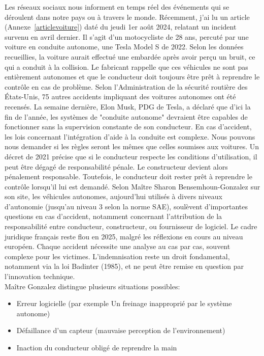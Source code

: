 Les réseaux sociaux nous informent en temps réel des événements qui se déroulent dans notre pays ou à travers le monde. 
Récemment, j'ai lu un article (Annexe~\ref{articlevoiture}) daté du jeudi 1er août 2024, relatant un incident survenu en avril dernier. Il s'agit d'un motocycliste de 28 ans, percuté par une voiture en conduite autonome, une Tesla Model S de 2022. Selon les données recueillies, la voiture aurait effectué une embardée après avoir perçu un bruit, ce qui a conduit à la collision. Le fabricant rappelle que ces véhicules ne sont pas entièrement autonomes et que le conducteur doit toujours être prêt à reprendre le contrôle en cas de problème. Selon l'Administration de la sécurité routière des États-Unis, 75 autres accidents impliquant des voitures autonomes ont été recensés. 
La semaine dernière, Elon Musk, PDG de Tesla, a déclaré que d'ici la fin de l'année, les systèmes de "conduite autonome" devraient être capables de fonctionner sans la supervision constante de son conducteur.
En cas d'accident, les lois concernant l'intégration d'aide à la conduite est complexe. Nous pouvons nous demander si les règles seront les mêmes que celles soumises aux voitures. Un décret de 2021 précise que si le conducteur respecte les conditions d’utilisation, il peut être dégagé de responsabilité pénale. Le constructeur devient alors pénalement responsable. Toutefois, le conducteur doit rester prêt à reprendre le contrôle lorsqu’il lui est demandé. Selon  Maître Sharon Bensemhoun-Gonzalez sur son site\cite{avocat}, les véhicules autonomes, aujourd’hui utilisés à divers niveaux d’autonomie (jusqu’au niveau 3 selon la norme SAE), soulèvent d’importantes questions en cas d’accident, notamment concernant l’attribution de la responsabilité entre conducteur, constructeur, ou fournisseur de logiciel. Le cadre juridique français reste flou en 2025, malgré les réflexions en cours au niveau européen. Chaque accident nécessite une analyse au cas par cas, souvent complexe pour les victimes. L’indemnisation reste un droit fondamental, notamment via la loi Badinter (1985), et ne peut être remise en question par l’innovation technique.\\
Maître Gonzalez distingue plusieurs situations possibles:
\begin{itemize}
    \item Erreur logicielle (par exemple Un freinage inapproprié par le système autonome)
    \item Défaillance d’un capteur (mauvaise perception de l’environnement)
    \item Inaction du conducteur obligé de reprendre la main 
\end{itemize}

